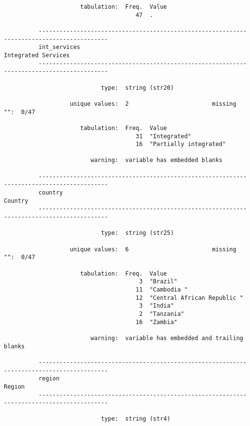 \documentclass{article}
\begin{document}
\begin{verbatim}
                      tabulation:  Freq.  Value
                                      47  .
          
          ------------------------------------------------------------------------------------------
          int_services                                                           Integrated Services
          ------------------------------------------------------------------------------------------
          
                            type:  string (str20)
          
                   unique values:  2                        missing "":  0/47
          
                      tabulation:  Freq.  Value
                                      31  "Integrated"
                                      16  "Partially integrated"
          
                         warning:  variable has embedded blanks
          
          ------------------------------------------------------------------------------------------
          country                                                                            Country
          ------------------------------------------------------------------------------------------
          
                            type:  string (str25)
          
                   unique values:  6                        missing "":  0/47
          
                      tabulation:  Freq.  Value
                                       3  "Brazil"
                                      11  "Cambodia "
                                      12  "Central African Republic "
                                       3  "India"
                                       2  "Tanzania"
                                      16  "Zambia"
          
                         warning:  variable has embedded and trailing blanks
          
          ------------------------------------------------------------------------------------------
          region                                                                              Region
          ------------------------------------------------------------------------------------------
          
                            type:  string (str4)
          

\end{verbatim}
\end{document}
